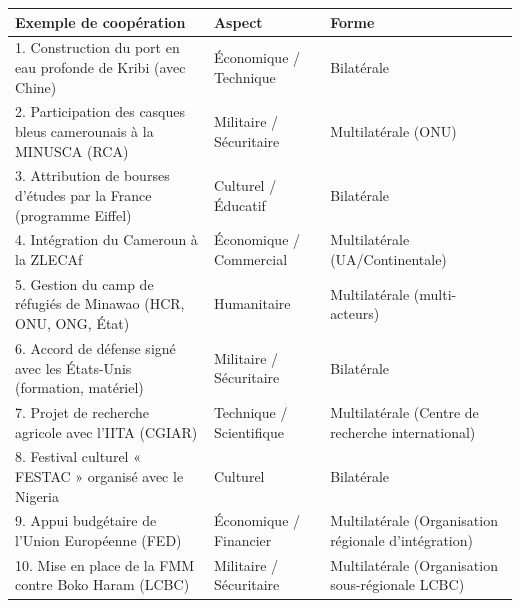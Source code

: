\documentclass[11pt]{article}
\newcounter{popsec}
\newcounter{popsub}
\newcommand{\courssub}[1]{%
  \stepcounter{popsub}%
  \par\vspace{9pt}\noindent{\popxbold\fontsize{11.5}{13}\selectfont\color{popink}{\color{poporange}\thepopsec.\thepopsub}\hspace{6pt}#1}\par\nopagebreak\vspace{4pt}
}
\begin{document}
\begin{corrige}
\begin{center}
\begin{tabularx}{\linewidth}{|l|X|X|}\hline
\textbf{Exemple de coopération} & \textbf{Aspect} & \textbf{Forme} \\ \hline
1. Construction du port en eau profonde de Kribi (avec Chine) & Économique / Technique & Bilatérale \\ \hline
2. Participation des casques bleus camerounais à la MINUSCA (RCA) & Militaire / Sécuritaire & Multilatérale (ONU) \\ \hline
3. Attribution de bourses d'études par la France (programme Eiffel) & Culturel / Éducatif & Bilatérale \\ \hline
4. Intégration du Cameroun à la ZLECAf & Économique / Commercial & Multilatérale (UA/Continentale) \\ \hline
5. Gestion du camp de réfugiés de Minawao (HCR, ONU, ONG, État) & Humanitaire & Multilatérale (multi-acteurs) \\ \hline
6. Accord de défense signé avec les États-Unis (formation, matériel) & Militaire / Sécuritaire & Bilatérale \\ \hline
7. Projet de recherche agricole avec l'IITA (CGIAR) & Technique / Scientifique & Multilatérale (Centre de recherche international) \\ \hline
8. Festival culturel « FESTAC » organisé avec le Nigeria & Culturel & Bilatérale \\ \hline
9. Appui budgétaire de l'Union Européenne (FED) & Économique / Financier & Multilatérale (Organisation régionale d'intégration) \\ \hline
10. Mise en place de la FMM contre Boko Haram (LCBC) & Militaire / Sécuritaire & Multilatérale (Organisation sous-régionale LCBC) \\ \hline
\end{tabularx}
\end{center}
\end{corrige}

\courssub{Je m'entraîne}
\end{document}
